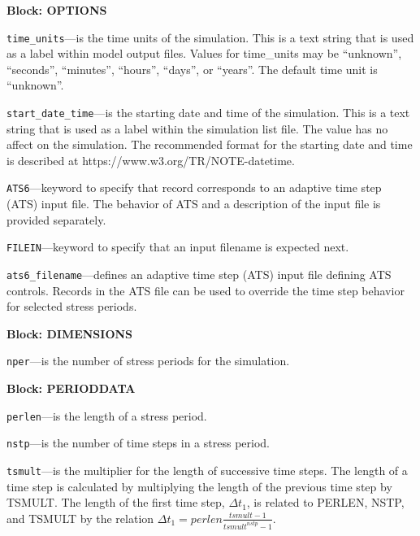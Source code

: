 
\item \textbf{Block: OPTIONS}

\begin{description}
\item \texttt{time\_units}---is the time units of the simulation.  This is a text string that is used as a label within model output files.  Values for time\_units may be ``unknown'',  ``seconds'', ``minutes'', ``hours'', ``days'', or ``years''.  The default time unit is ``unknown''.

\item \texttt{start\_date\_time}---is the starting date and time of the simulation.  This is a text string that is used as a label within the simulation list file.  The value has no affect on the simulation.  The recommended format for the starting date and time is described at https://www.w3.org/TR/NOTE-datetime.

\item \texttt{ATS6}---keyword to specify that record corresponds to an adaptive time step (ATS) input file.  The behavior of ATS and a description of the input file is provided separately.

\item \texttt{FILEIN}---keyword to specify that an input filename is expected next.

\item \texttt{ats6\_filename}---defines an adaptive time step (ATS) input file defining ATS controls.  Records in the ATS file can be used to override the time step behavior for selected stress periods.

\end{description}
\item \textbf{Block: DIMENSIONS}

\begin{description}
\item \texttt{nper}---is the number of stress periods for the simulation.

\end{description}
\item \textbf{Block: PERIODDATA}

\begin{description}
\item \texttt{perlen}---is the length of a stress period.

\item \texttt{nstp}---is the number of time steps in a stress period.

\item \texttt{tsmult}---is the multiplier for the length of successive time steps. The length of a time step is calculated by multiplying the length of the previous time step by TSMULT. The length of the first time step, $\Delta t_1$, is related to PERLEN, NSTP, and TSMULT by the relation $\Delta t_1= perlen \frac{tsmult - 1}{tsmult^{nstp}-1}$.

\end{description}

